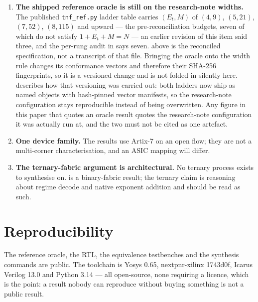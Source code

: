 \begin{enumerate}[leftmargin=*]
\item \textbf{The shipped reference oracle is still on the research-note widths.}
The published \texttt{tnf\_ref.py} ladder table carries $(E_t,M)$ of
$(4,9)$, $(5,21)$, $(7,52)$, $(8,115)$ and upward --- the pre-reconciliation
budgets, seven of which do not satisfy $1+E_t+M=N$ --- an earlier revision of this
item said three, and the per-rung audit in  says
seven.  above is
the reconciled specification, not a transcript of that file. Bringing the oracle
onto the width rule changes its conformance vectors and therefore their SHA-256
fingerprints, so it is a versioned change and is not folded in silently here.
 describes how that versioning was carried out: both
ladders now ship as named objects with hash-pinned vector manifests, so the
research-note configuration stays reproducible instead of being overwritten. Any
figure in this paper that quotes an oracle result quotes the research-note
configuration it was actually run at, and the two must not be cited as one
artefact.

\item \textbf{One device family.} The results use Artix-7 on an open flow; they
are not a multi-corner characterisation, and an ASIC mapping will differ.

\item \textbf{The ternary-fabric argument is architectural.} No ternary process
exists to synthesise on.  is a binary-fabric result;
the ternary claim is reasoning about regime decode and native exponent addition
and should be read as such.
\end{enumerate}



\section*{Reproducibility}

The reference oracle, the RTL, the equivalence testbenches and the synthesis
commands are public. The toolchain is Yosys 0.65, nextpnr-xilinx 1743d0f,
Icarus Verilog 13.0 and Python 3.14 --- all open-source, none requiring a
licence, which is the point: a result nobody can reproduce without buying
something is not a public result.


